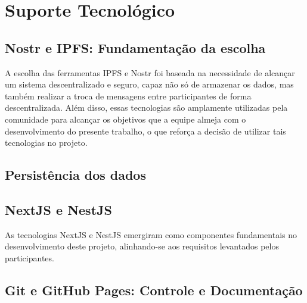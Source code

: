 \chapter[Elementos do Texto]{Suporte Tecnológico}

\section{Nostr e IPFS: Fundamentação da escolha}
A escolha das ferramentas IPFS e Nostr foi baseada na necessidade de alcançar um sistema descentralizado e seguro, capaz não só de armazenar os dados, mas também realizar a troca de mensagens entre participantes de forma descentralizada. Além disso, essas tecnologias são amplamente utilizadas pela comunidade para alcançar os objetivos que a equipe almeja com o desenvolvimento do presente trabalho, o que reforça a decisão de utilizar tais tecnologias no projeto.

\section{Persistência dos dados}

\section{NextJS e NestJS}
As tecnologias NextJS e NestJS emergiram como componentes fundamentais no desenvolvimento deste projeto, alinhando-se aos requisitos levantados pelos participantes. 


\section{Git e GitHub Pages: Controle e Documentação}
